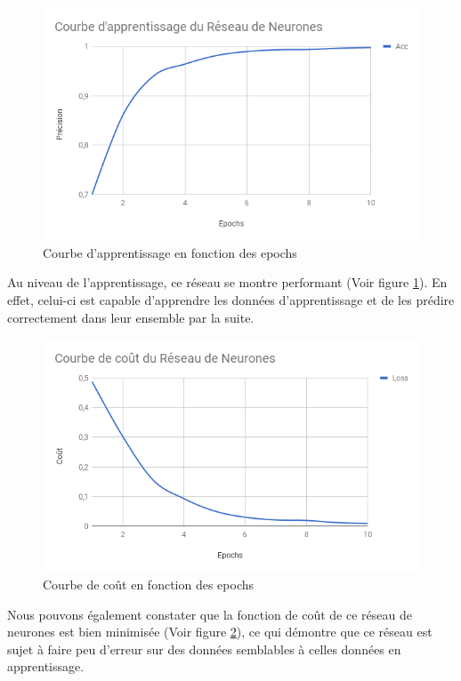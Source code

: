 \begin{figure}[h!]
	\centering
	\includegraphics[scale=0.6]{./img/learn_nn_chart.png}
	\caption{Courbe d'apprentissage en fonction des epochs}
	\label{fig:nn_app}
\end{figure}

\par Au niveau de l'apprentissage, ce réseau se montre performant (Voir figure \ref{fig:nn_app}). En effet, celui-ci est capable d'apprendre les données d'apprentissage et de les prédire correctement dans leur ensemble par la suite. \\

\begin{figure}[h!]
	\centering
	\includegraphics[scale=0.6]{./img/loss_nn_chart.png}
	\caption{Courbe de coût en fonction des epochs}
	\label{fig:nn_loss}
\end{figure}

\par Nous pouvons également constater que la fonction de coût de ce réseau de neurones est bien minimisée (Voir figure \ref{fig:nn_loss}), ce qui démontre que ce réseau est sujet à faire peu d'erreur sur des données semblables à celles données en apprentissage.

